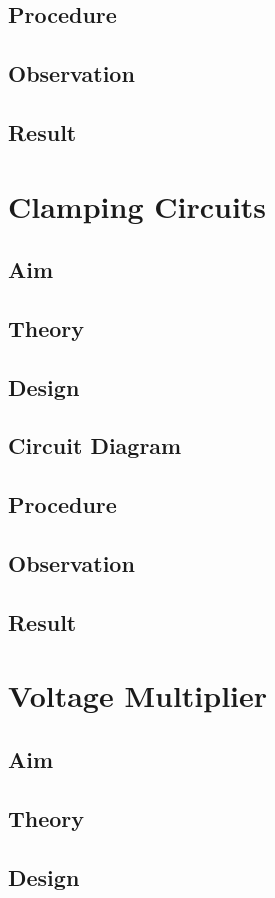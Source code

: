 \documentclass{book}
\begin{document}
\section*{Procedure}
\section*{Observation}
\section*{Result}
\chapter[Clamping Circuits]{Clamping Circuits}
\section*{Aim}
\section*{Theory}
\section*{Design}
\section*{Circuit Diagram}
\section*{Procedure}
\section*{Observation}
\section*{Result}
\chapter[Voltage Multiplier circuit]{Voltage Multiplier}
\section*{Aim}
\section*{Theory}
\section*{Design}
\end{document}
